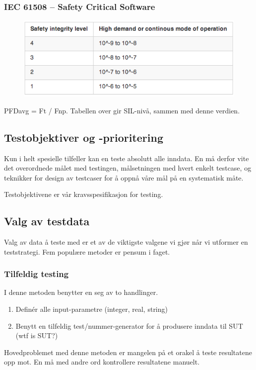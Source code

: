 \subsubsection{IEC 61508 -- Safety Critical Software}

\begin{figure}[htbp]
\centering
\includegraphics{Forelesning 06/img/tabell4.png}
\caption{}
\end{figure}

PFDavg = Ft / Fnp. Tabellen over gir SIL-nivå, sammen med denne verdien.

\subsection{Testobjektiver og -prioritering}

Kun i helt spesielle tilfeller kan en teste absolutt alle inndata. En må
derfor vite det overordnede målet med testingen, målsetningen med hvert
enkelt testcase, og teknikker for design av testcaser for å oppnå våre
mål på en systematisk måte.

Testobjektivene er vår kravsspesifikasjon for testing.

\subsection{Valg av testdata}

Valg av data å teste med er et av de viktigste valgene vi gjør når vi
utformer en teststrategi. Fem populære metoder er pensum i faget.

\subsubsection{Tilfeldig testing}

I denne metoden benytter en seg av to handlinger.

\begin{enumerate}[1.]
\item
  Definér alle input-parametre (integer, real, string)
\item
  Benytt en tilfeldig test/nummer-generator for å produsere inndata til
  SUT (wtf is SUT?)
\end{enumerate}
Hovedproblemet med denne metoden er mangelen på et orakel å teste
resultatene opp mot. En må med andre ord kontrollere resultatene
manuelt.

